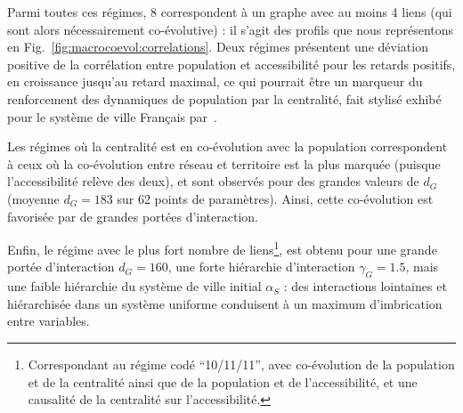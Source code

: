 





Parmi toutes ces régimes, 8 correspondent à un graphe avec au moins 4 liens (qui sont alors nécessairement co-évolutive) : il s'agit des profils que nous représentons en Fig.~\ref{fig:macrocoevol:correlations}. Deux régimes présentent une déviation positive de la corrélation entre population et accessibilité pour les retards positifs, en croissance jusqu'au retard maximal, ce qui pourrait être un marqueur du renforcement des dynamiques de population par la centralité, fait stylisé exhibé pour le système de ville Français par~\cite{bretagnolle:tel-00459720}.

Les régimes où la centralité est en co-évolution avec la population correspondent à ceux où la co-évolution entre réseau et territoire est la plus marquée (puisque l'accessibilité relève des deux), et sont observés pour des grandes valeurs de $d_G$ (moyenne $d_G=183$ sur 62 points de paramètres). Ainsi, cette co-évolution est favorisée par de grandes portées d'interaction.

Enfin, le régime avec le plus fort nombre de liens\footnote{Correspondant au régime codé ``10/11/11'', avec co-évolution de la population et de la centralité ainsi que de la population et de l'accessibilité, et une causalité de la centralité sur l'accessibilité.}, est obtenu pour une grande portée d'interaction $d_G = 160$, une forte hiérarchie d'interaction $\gamma_G = 1.5$, mais une faible hiérarchie du système de ville initial $\alpha_S$ : des interactions lointaines et hiérarchisée dans un système uniforme conduisent à un maximum d'imbrication entre variables.


